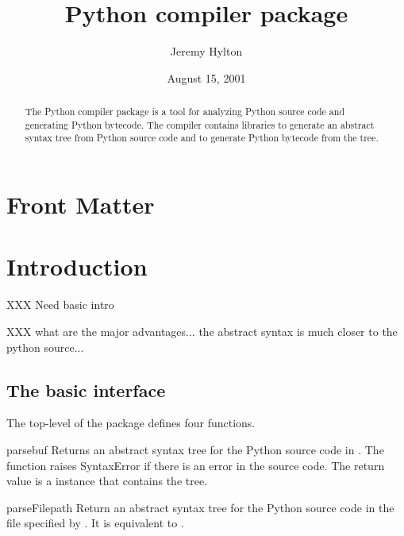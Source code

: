 \documentclass{manual}
\title{Python compiler package}
\author{Jeremy Hylton}
\date{August 15, 2001}           %
\begin{document}
\maketitle

\ifhtml
\chapter*{Front Matter\label{front}}
\fi

%

\begin{abstract}

\noindent
The Python compiler package is a tool for analyzing Python source code
and generating Python bytecode.  The compiler contains libraries to
generate an abstract syntax tree from Python source code and to
generate Python bytecode from the tree.

\end{abstract}

\tableofcontents

\chapter{Introduction\label{Introduction}}

XXX Need basic intro

XXX what are the major advantages...  the abstract syntax is much
closer to the python source...

\section{The basic interface}

The top-level of the package defines four functions.

\begin{funcdesc}{parse}{buf}
Returns an abstract syntax tree for the Python source code in .
The function raises SyntaxError if there is an error in the source
code.  The return value is a  instance that
contains the tree.  
\end{funcdesc}

\begin{funcdesc}{parseFile}{path}
Return an abstract syntax tree for the Python source code in the file
specified by .  It is equivalent to
.
\end{funcdesc}
\end{document}

